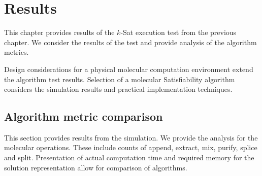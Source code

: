 \chapter{Results}

This chapter provides results of the $k$-{\sc Sat} execution test from the previous chapter.  We consider the results of the test and provide analysis of the algorithm metrics.  

Design considerations for a physical molecular computation environment extend the algorithm test results.  Selection of a molecular {\sc Satisfiability} algorithm considers the simulation results and practical implementation techniques.

	\section{Algorithm metric comparison}
	
This section provides results from the simulation.  We provide the analysis for the molecular operations.  These include counts of append, extract, mix, purify, splice and split.  Presentation of actual computation time and required memory for the solution representation allow for comparison of algorithms.

\FloatBarrier
		

